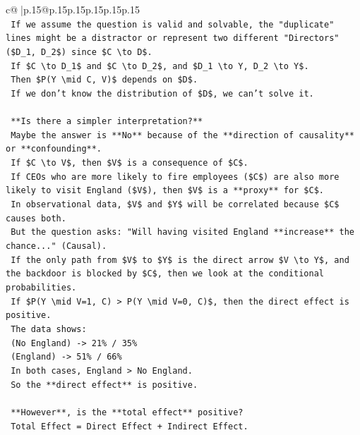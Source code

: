 \documentclass{article}
\begin{document}
{\begin{supertabular}{c@{$\;$}|p{.15\linewidth}@{}p{.15\linewidth}p{.15\linewidth}p{.15\linewidth}p{.15\linewidth}p{.15\linewidth}}
{{{\\ 
\texttt{    If we assume the question is valid and solvable, the "duplicate" lines might be a distractor or represent two different "Directors" (\$D\_1, D\_2\$) since \$C \textbackslash{}to D\$.} \\
\texttt{    If \$C \textbackslash{}to D\_1\$ and \$C \textbackslash{}to D\_2\$, and \$D\_1 \textbackslash{}to Y, D\_2 \textbackslash{}to Y\$.} \\
\texttt{    Then \$P(Y \textbackslash{}mid C, V)\$ depends on \$D\$.} \\
\texttt{    If we don't know the distribution of \$D\$, we can't solve it.} \\
\\ 
\texttt{    **Is there a simpler interpretation?**} \\
\texttt{    Maybe the answer is **No** because of the **direction of causality** or **confounding**.} \\
\texttt{    If \$C \textbackslash{}to V\$, then \$V\$ is a consequence of \$C\$.} \\
\texttt{    If CEOs who are more likely to fire employees (\$C\$) are also more likely to visit England (\$V\$), then \$V\$ is a **proxy** for \$C\$.} \\
\texttt{    In observational data, \$V\$ and \$Y\$ will be correlated because \$C\$ causes both.} \\
\texttt{    But the question asks: "Will having visited England **increase** the chance..." (Causal).} \\
\texttt{    If the only path from \$V\$ to \$Y\$ is the direct arrow \$V \textbackslash{}to Y\$, and the backdoor is blocked by \$C\$, then we look at the conditional probabilities.} \\
\texttt{    If \$P(Y \textbackslash{}mid V=1, C) > P(Y \textbackslash{}mid V=0, C)\$, then the direct effect is positive.} \\
\texttt{    The data shows:} \\
\texttt{    (No England) {-}> 21\% / 35\%} \\
\texttt{    (England) {-}> 51\% / 66\%} \\
\texttt{    In both cases, England > No England.} \\
\texttt{    So the **direct effect** is positive.} \\
\\ 
\texttt{    **However**, is the **total effect** positive?} \\
\texttt{    Total Effect = Direct Effect + Indirect Effect.} \\
}}}
\end{supertabular}}
\end{document}

